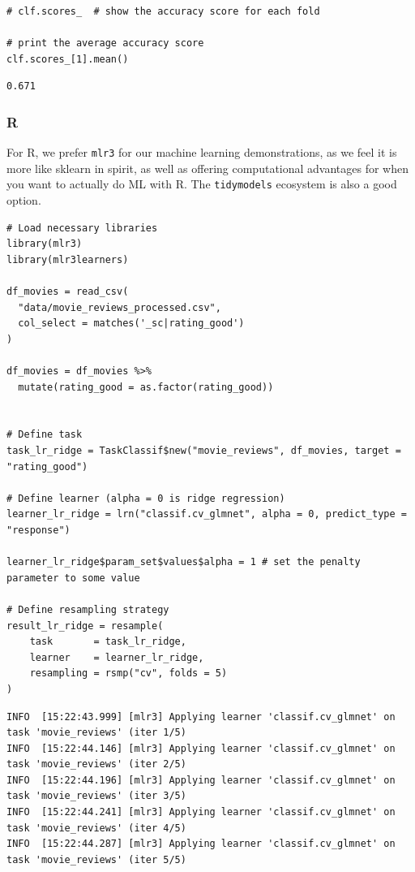 \documentclass[
  letterpaper,
]{krantz}
\begin{document}
\begin{verbatim}
# clf.scores_  # show the accuracy score for each fold

# print the average accuracy score
clf.scores_[1].mean()
\end{verbatim}

\begin{verbatim}
0.671
\end{verbatim}

\subsubsection{R}

For R, we prefer \texttt{mlr3} for our machine learning demonstrations,
as we feel it is more like sklearn in spirit, as well as offering
computational advantages for when you want to actually do ML with R. The
\texttt{tidymodels} ecosystem is also a good option.

\begin{verbatim}
# Load necessary libraries
library(mlr3)
library(mlr3learners)

df_movies = read_csv(
  "data/movie_reviews_processed.csv", 
  col_select = matches('_sc|rating_good')
)

df_movies = df_movies %>% 
  mutate(rating_good = as.factor(rating_good))


# Define task
task_lr_ridge = TaskClassif$new("movie_reviews", df_movies, target = "rating_good")

# Define learner (alpha = 0 is ridge regression)
learner_lr_ridge = lrn("classif.cv_glmnet", alpha = 0, predict_type = "response")

learner_lr_ridge$param_set$values$alpha = 1 # set the penalty parameter to some value

# Define resampling strategy
result_lr_ridge = resample(
    task       = task_lr_ridge,
    learner    = learner_lr_ridge,
    resampling = rsmp("cv", folds = 5)
)
\end{verbatim}

\begin{verbatim}
INFO  [15:22:43.999] [mlr3] Applying learner 'classif.cv_glmnet' on task 'movie_reviews' (iter 1/5)
INFO  [15:22:44.146] [mlr3] Applying learner 'classif.cv_glmnet' on task 'movie_reviews' (iter 2/5)
INFO  [15:22:44.196] [mlr3] Applying learner 'classif.cv_glmnet' on task 'movie_reviews' (iter 3/5)
INFO  [15:22:44.241] [mlr3] Applying learner 'classif.cv_glmnet' on task 'movie_reviews' (iter 4/5)
INFO  [15:22:44.287] [mlr3] Applying learner 'classif.cv_glmnet' on task 'movie_reviews' (iter 5/5)
\end{verbatim}
\end{document}
